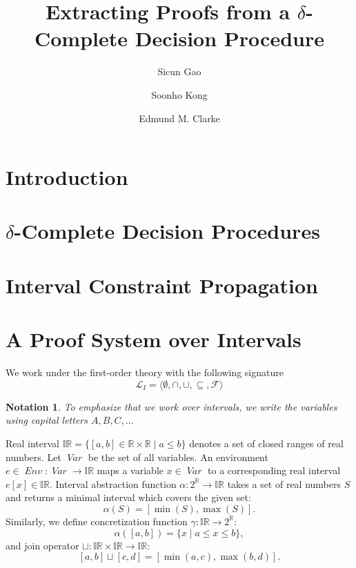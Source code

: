 \documentclass[envcountsect]{llncs}
\title{Extracting Proofs from a $\delta$-Complete Decision Procedure}
\author{Sicun Gao \and Soonho Kong \and Edmund M. Clarke}
\institute{Carnegie Mellon University, Pittsburgh, PA 15213}
\newcommand{\Var}{\mathop{\mathit{Var}}}
\newcommand{\Env}{\mathop{\mathit{Env}}}
\newtheorem{notation}[theorem]{Notation}
\begin{document}
\maketitle

\begin{abstract}
\end{abstract}

\section{Introduction}

\section{$\delta$-Complete Decision Procedures}

\section{Interval Constraint Propagation}



\section{A Proof System over Intervals}

\begin{definition}[Language]
We work under the first-order theory with the following signature 
$$\mathcal{L}_{I} = \langle \emptyset, \cap, \cup, \subseteq,
\mathcal{F}\rangle$$
\end{definition}

\begin{notation}
To emphasize that we work over intervals, we write the variables using capital
letters $A, B, C, ...$
\end{notation}


\begin{definition}[Semantics]

\end{definition}



\begin{definition}[Axioms]
 
\end{definition}





Real interval $\mathbb{IR} = \{ [a, b] \in \mathbb{R} \times
\mathbb{R} \mid a \le b \}$ denotes a set of closed ranges of real
numbers. Let $\Var$ be the set of all variables. An environment $e \in
\Env : \Var \to \mathbb{IR}$ maps a variable $x \in \Var$ to a
corresponding real interval $e[x] \in \mathbb{IR}$. Interval
abstraction function $\alpha : 2^{\mathbb{R}} \to \mathbb{IR}$ takes a
set of real numbers $S$ and returns a minimal interval which covers
the given set:
\[
\alpha(S) = [\min(S), \max(S)].
\]
Similarly, we define concretization function $\gamma : \mathbb{IR} \to
2^{\mathbb{R}}$:
\[
\alpha([a, b]) = \{ x \mid a \le x \le b \},
\]
and join operator $\sqcup : \mathbb{IR} \times \mathbb{IR} \to
\mathbb{IR}$:
\[
[a,b] \sqcup [c, d] = [\min(a,c), \max(b, d)].
\]
\end{document}

